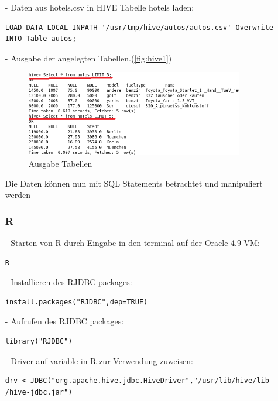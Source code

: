 \begin{itemize}
\item[-] Daten aus hotels.csv in HIVE Tabelle hotels laden:
\begin{lstlisting}
LOAD DATA LOCAL INPATH '/usr/tmp/hive/autos/autos.csv' Overwrite INTO Table autos;
\end{lstlisting}
\item[-] Ausgabe der angelegten Tabellen.(\autoref{fig:hive1})
\begin{figure}[!htb]
        \begin{minipage}{1\textwidth}
                \centering
                \includegraphics[width=0.90\textwidth]{pics/HIVE.png}\par\vspace{0cm}
                \caption{Ausgabe Tabellen}
                \label{fig:hive1}
        \end{minipage}
\end{figure}
Die Daten können nun mit SQL Statements betrachtet und manipuliert werden

\subsubsection*{R}
\item[-]Starten von R durch Eingabe in den terminal auf der Oracle 4.9 VM:
\begin{lstlisting}
R
\end{lstlisting}

\item[-] Installieren des RJDBC packages:
\begin{lstlisting}
install.packages("RJDBC",dep=TRUE)
\end{lstlisting}

\item[-] Aufrufen des RJDBC packages:
\begin{lstlisting}
library("RJDBC")
\end{lstlisting}

\item[-] Driver auf variable in R zur Verwendung zuweisen:
\begin{lstlisting}
drv <-JDBC("org.apache.hive.jdbc.HiveDriver","/usr/lib/hive/lib         /hive-jdbc.jar")
\end{lstlisting}


\end{itemize}
